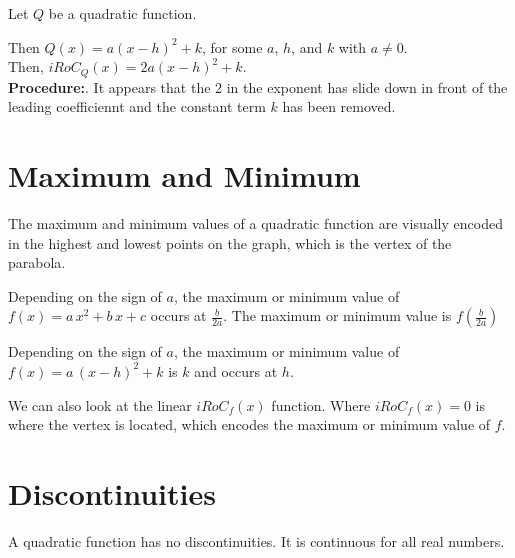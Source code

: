 \documentclass{ximera}
\begin{document}
\begin{procedure}
Let $Q$ be a quadratic function.

Then $Q(x) = a (x - h)^2 + k$, for some $a$, $h$, and $k$ with $a \ne 0$. \\

Then, $iRoC_Q(x) = 2 a (x - h)^2 + k$. \\


\textbf{Procedure:}. It appears that the $2$ in the exponent has slide down in front of the leading coefficiennt and the constant term $k$ has been removed.



\end{procedure}












\section{Maximum and Minimum}


The maximum and minimum values of a quadratic function are visually encoded in the highest and lowest points on the  graph, which is the vertex of the parabola.

Depending on the sign of $a$, the maximum or minimum value of $f(x) = a \, x^2 + b \, x + c$ occurs at $\frac{b}{2a}$. The maximum or minimum value is $f\left( \frac{b}{2a} \right)$


Depending on the sign of $a$, the maximum or minimum value of $f(x) = a \, (x - h)^2 + k$ is $k$ and occurs at $h$. 



We can also look at the linear $iRoC_f(x)$ function.  Where $iRoC_f(x) = 0$ is where the vertex is located, which encodes the maximum or minimum value of $f$.




\section{Discontinuities}


A quadratic function has no discontinuities.  It is continuous for all real numbers.
\end{document}
